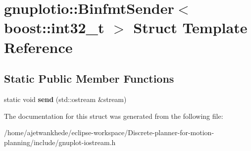 \hypertarget{structgnuplotio_1_1BinfmtSender_3_01boost_1_1int32__t_01_4}{}\section{gnuplotio\+:\+:Binfmt\+Sender$<$ boost\+:\+:int32\+\_\+t $>$ Struct Template Reference}
\label{structgnuplotio_1_1BinfmtSender_3_01boost_1_1int32__t_01_4}
\subsection*{Static Public Member Functions}
\begin{DoxyCompactItemize}
\item 
\mbox{\label{structgnuplotio_1_1BinfmtSender_3_01boost_1_1int32__t_01_4_a44f75b80ef3f5def62eaa2093810fd35}} 
static void {\bfseries send} (std\+::ostream \&stream)
\end{DoxyCompactItemize}


The documentation for this struct was generated from the following file\+:\begin{DoxyCompactItemize}
\item 
/home/ajetwankhede/eclipse-\/workspace/\+Discrete-\/planner-\/for-\/motion-\/planning/include/gnuplot-\/iostream.\+h\end{DoxyCompactItemize}
